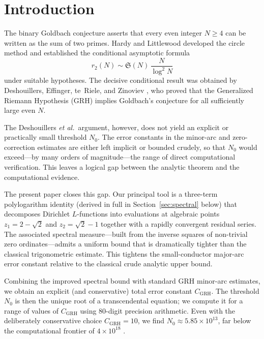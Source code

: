 \documentclass[11pt,a4paper]{article}
\theoremstyle{plain}
\theoremstyle{definition}
\theoremstyle{remark}
\numberwithin{equation}{section}
\numberwithin{table}{section}
\begin{document}
\tableofcontents
\bigskip

\section{Introduction}
\label{sec:intro}

The binary Goldbach conjecture asserts that every even integer $N\ge 4$
can be written as the sum of two primes.  Hardy and Littlewood
\cite{HardyLittlewood1923} developed the circle method and established the
conditional asymptotic formula
\begin{equation}
  r_2(N) \sim \mathfrak{S}(N)\,\frac{N}{\log^2 N}
\end{equation}
under suitable hypotheses.  The decisive conditional result was obtained by
Deshouillers, Effinger, te~Riele, and Zinoviev \cite{Deshouillers1997}, who
proved that the Generalized Riemann Hypothesis (GRH) implies Goldbach's
conjecture for all sufficiently large even $N$.

The Deshouillers \emph{et al.}\ argument, however, does not yield an
explicit or practically small threshold $N_0$.  The error constants in the
minor-arc and zero-correction estimates are either left implicit or bounded
crudely, so that $N_0$ would exceed---by many orders of magnitude---the
range of direct computational verification.  This leaves a logical gap
between the analytic theorem and the computational evidence.

The present paper closes this gap.  Our principal tool is a three-term
polylogarithm identity (derived in full in Section~\ref{sec:spectral} below) that decomposes
Dirichlet $L$-functions into evaluations at algebraic points
$z_1=2-\sqrt{2}$ and $z_2=\sqrt{2}-1$ together with a rapidly convergent
residual series.  The associated spectral measure---built from the inverse
squares of non-trivial zero ordinates---admits a uniform bound that is
dramatically tighter than the classical trigonometric estimate.  This
tightens the small-conductor major-arc error constant relative to the classical crude analytic upper bound.

Combining the improved spectral bound with standard GRH minor-arc
estimates, we obtain an explicit (and conservative) total error constant
$C_{\mathrm{GRH}}$.  The threshold $N_0$ is then the unique root of a
transcendental equation; we compute it for a range of values of
$C_{\mathrm{GRH}}$ using 80-digit precision arithmetic.  Even with the
deliberately conservative choice $C_{\mathrm{GRH}}=10$, we find
$N_0\approx 5.85\times 10^{13}$, far below the computational frontier of
$4\times 10^{18}$ \cite{Oliveira2013}.
\end{document}
